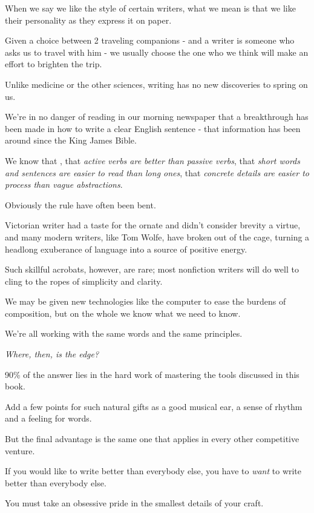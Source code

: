 \documentclass{book}
\numberwithin{equation}{section}
\begin{document}
When we say we like the style of certain writers, what we mean is that we like their personality as they express it on paper.

Given a choice between 2 traveling companions - and a writer is someone who asks us to travel with him - we usually choose the one who we think will make an effort to brighten the trip.

%
Unlike medicine or the other sciences, writing has no new discoveries to spring on us.

We're in no danger of reading in our morning newspaper that a breakthrough has been made in how to write a clear English sentence - that information has been around since the King James Bible.

We know that , that \textit{active verbs are better than passive verbs}, that \textit{short words and sentences are easier to read than long ones}, that \textit{concrete details are easier to process than vague abstractions}.

%
Obviously the rule have often been bent.

Victorian writer had a taste for the ornate and didn't consider brevity a virtue, and many modern writers, like Tom Wolfe, have broken out of the cage, turning a headlong exuberance of language into a source of positive energy.

Such skillful acrobats, however, are rare; most nonfiction writers will do well to cling to the ropes of simplicity and clarity.

We may be given new technologies like the computer to ease the burdens of composition, but on the whole we know what we need to know.

We're all working with the same words and the same principles.

%
\textit{Where, then, is the edge?}

90\% of the answer lies in the hard work of mastering the tools discussed in this book.

Add a few points for such natural gifts as a good musical ear, a sense of rhythm and a feeling for words.

But the final advantage is the same one that applies in every other competitive venture.

If you would like to write better than everybody else, you have to \textit{want} to write better than everybody else.

You must take an obsessive pride in the smallest details of your craft.
\end{document}
